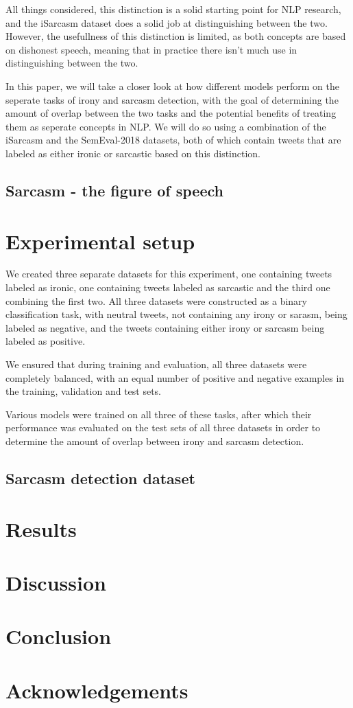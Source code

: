 \documentclass[10pt, a4paper]{article}
\begin{document}
All things considered, this distinction is a solid starting point for NLP research, and the iSarcasm \citep{iSarcasm} dataset
does a solid job at distinguishing between the two. However, the usefullness of this distinction is limited, as both concepts
are based on dishonest speech, meaning that in practice there isn't much use in distinguishing between the two.

In this paper, we will take a closer look at how different models perform on the seperate tasks of irony and sarcasm detection,
with the goal of determining the amount of overlap between the two tasks and the potential benefits of treating them as seperate
concepts in NLP. We will do so using a combination of the iSarcasm \citep{iSarcasm} and the SemEval-2018 \citep{semeval-2018} 
datasets, both of which contain tweets that are labeled as either ironic or sarcastic based on this distinction.

\subsection{Sarcasm - the figure of speech}

\section{Experimental setup}
We created three separate datasets for this experiment, one containing tweets labeled as ironic, one containing tweets labeled
as sarcastic and the third one combining the first two. All three datasets were constructed as a binary classification task, 
with neutral tweets, not containing any irony or sarasm, being labeled as negative, and the tweets containing either irony or
sarcasm being labeled as positive.

We ensured that during training and evaluation, all three datasets were completely balanced, with an equal number of positive
and negative examples in the training, validation and test sets.

Various models were trained on all three of these tasks, after which their performance was evaluated on the test sets of all
three datasets in order to determine the amount of overlap between irony and sarcasm detection.



\subsection{Sarcasm detection dataset}
\citep{iSarcasm}
\section{Results}

\section{Discussion}

\section{Conclusion}

\section*{Acknowledgements}


 
\end{document}
